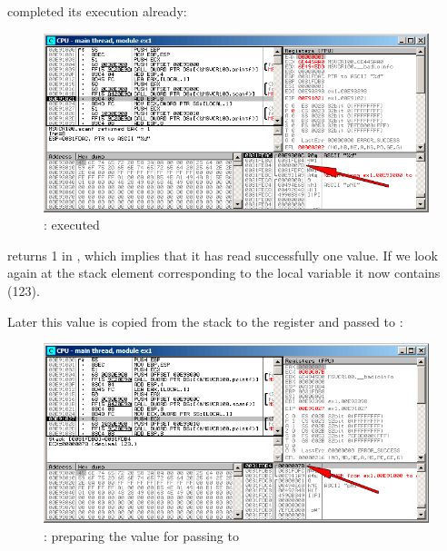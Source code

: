 \clearpage
\scanf completed its execution already:

\begin{figure}[H]
\centering
\includegraphics[scale=\FigScale]{patterns/04_scanf/1_simple/ex1_olly_3.png}
\caption{\olly: \scanf executed}
\label{fig:scanf_ex1_olly_3}
\end{figure}

\scanf returns 1 in \EAX, which implies that it has read successfully one value.
If we look again at the stack element corresponding to the local variable it now contains  (123).

\clearpage

Later this value is copied from the stack to the \ECX register and passed to \printf:

\begin{figure}[H]
\centering
\includegraphics[scale=\FigScale]{patterns/04_scanf/1_simple/ex1_olly_4.png}
\caption{\olly: preparing the value for passing to \printf}
\label{fig:scanf_ex1_olly_4}
\end{figure}
